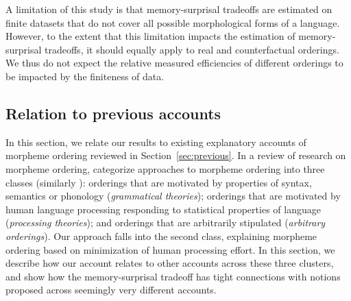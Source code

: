 \documentclass[11pt,letterpaper]{article}
\newcommand{\citet}{\Textcite}
\newcommand\mhahn[1]{{\color{red}(#1)}}
\begin{document}
A limitation of this study is that memory-surprisal tradeoffs are estimated on finite datasets that do not cover all possible morphological forms of a language. However, to the extent that this limitation impacts the estimation of memory-surprisal tradeoffs, it should equally apply to real and counterfactual orderings. We thus do not expect the relative measured efficiencies of different orderings to be impacted by the finiteness of data.





\subsection{Relation to previous accounts}


In this section, we relate our results to existing explanatory accounts of morpheme ordering reviewed in Section~\ref{sec:previous}.
In a review of research on morpheme ordering, \citet{manova2010modeling} %
categorize approaches to morpheme ordering into three classes (similarly \citet{rice2000morpheme, rice2011principles}): orderings that are motivated by properties of syntax, semantics or phonology (\textit{grammatical theories}); orderings that are motivated by human language processing responding to statistical properties of language (\textit{processing theories}); and orderings that are arbitrarily stipulated  (\textit{arbitrary orderings}).
Our approach falls into the second class, explaining morpheme ordering based on minimization of human processing effort.
In this section, we describe how our account relates to other accounts across these three clusters, and show how the memory-surprisal tradeoff has tight connections with notions proposed across seemingly very different accounts.





\end{document}
